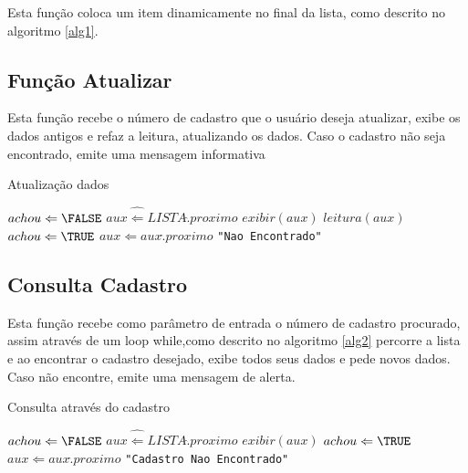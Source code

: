 \documentclass[12pt]{article}
\begin{document}
Esta função coloca um item dinamicamente no final da lista, como descrito no algoritmo \ref{alg1}.



\subsection{Função Atualizar}

Esta função recebe o número de cadastro que o usuário deseja atualizar,
exibe os dados antigos e refaz a leitura, atualizando os dados. Caso
o cadastro não seja encontrado, emite uma mensagem informativa


\begin{algorithm}                      %
\caption{Atualização dados}          %
\label{alg2}                           %
\begin{algorithmic}                    %
    \STATE $achou \Leftarrow \FALSE$
    \STATE $aux\hat \Leftarrow LISTA\hat.proximo$
        \STATE $exibir(aux)$
        \STATE $leitura(aux)$
        \STATE $achou \Leftarrow \TRUE$
      \ENDIF  
    \STATE $aux \Leftarrow aux\hat.proximo$
    \ENDWHILE
      \PRINT \texttt{"Nao Encontrado"}
    \ENDIF
\end{algorithmic}
\end{algorithm}  


\subsection{Consulta Cadastro}

Esta função recebe como parâmetro de entrada o número de cadastro procurado, assim
através de um loop while,como descrito no algoritmo \ref{alg2} percorre a lista e ao encontrar o cadastro desejado, exibe
todos seus dados e pede novos dados. Caso não encontre, emite uma mensagem de alerta.

\begin{algorithm}                      %
\caption{Consulta através do cadastro}          %
\label{alg3}                           %
\begin{algorithmic}                    %
    \STATE $achou \Leftarrow \FALSE$
    \STATE $aux\hat \Leftarrow LISTA\hat.proximo$
        \STATE $exibir(aux)$
        \STATE $achou \Leftarrow \TRUE$
      \ENDIF  
    \STATE $aux \Leftarrow aux\hat.proximo$
    \ENDWHILE
      \PRINT \texttt{"Cadastro Nao Encontrado"}
    \ENDIF
\end{algorithmic}
\end{algorithm}   
\end{document}
